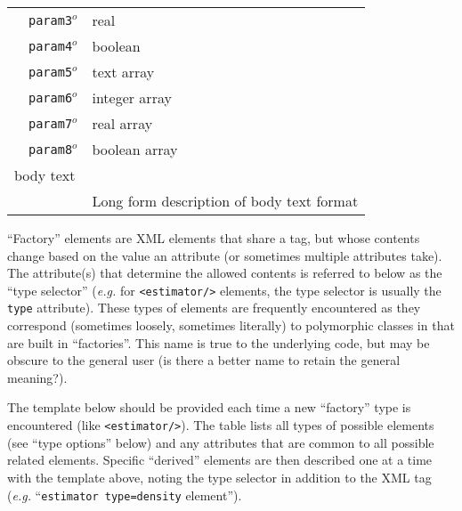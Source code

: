\begin{table}[h]
\begin{center}
\begin{tabularx}{\textwidth}{l l l l l l }
   &   \texttt{param3}$^o$&  real              &                  &                     &                       \\
   &   \texttt{param4}$^o$&  boolean           &                  &                     &                       \\
   &   \texttt{param5}$^o$&  text array        &                  &                     &                       \\
   &   \texttt{param6}$^o$&  integer array     &                  &                     &                       \\
   &   \texttt{param7}$^o$&  real array        &                  &                     &                       \\
   &   \texttt{param8}$^o$&  boolean array     &                  &                     &                       \\
\multicolumn{2}{l}{body text}  & \multicolumn{4}{l}{}\\
   &                           & \multicolumn{4}{l}{Long form description of body text format}                   \\
  \hline
\end{tabularx}
\end{center}
\end{table}
\FloatBarrier



``Factory'' elements are XML elements that share a tag, but whose contents change based on the value an attribute (or sometimes multiple attributes take).  The attribute(s) that determine the allowed contents is referred to below as the ``type selector''  (\textit{e.g.} for \texttt{<estimator/>} elements, the type selector is usually the \texttt{type} attribute).  These types of elements are frequently encountered as they correspond (sometimes loosely, sometimes literally) to polymorphic classes in \qmcpack that are built in ``factories''.  This name is true to the underlying code, but may be obscure to the general user (is there a better name to retain the general meaning?).   

The template below should be provided each time a new ``factory'' type is encountered (like \texttt{<estimator/>}).  The table lists all types of possible elements (see ``type options'' below) and any attributes that are common to all possible related elements.  Specific ``derived'' elements are then described one at a time with the template above, noting the type selector in addition to the XML tag (\textit{e.g.} ``\texttt{estimator type=density} element'').

